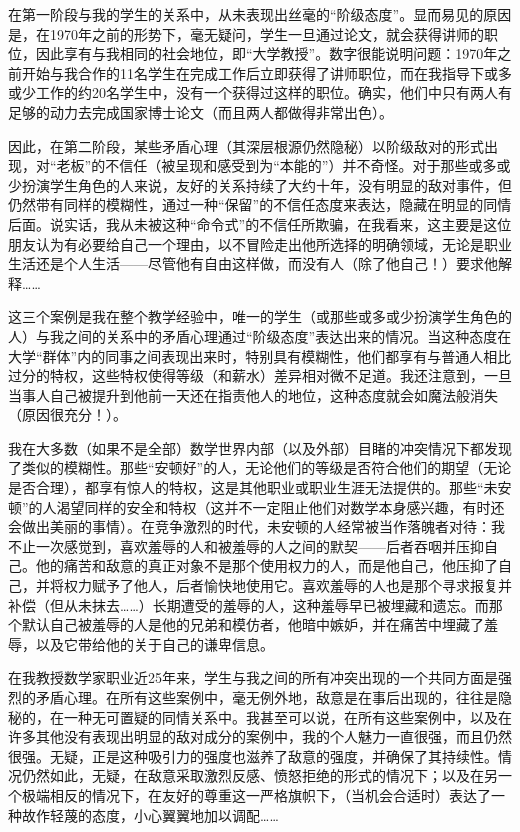 在第一阶段与我的学生的关系中，从未表现出丝毫的``阶级态度''。显而易见的原因是，在1970年之前的形势下，毫无疑问，学生一旦通过论文，就会获得讲师的职位，因此享有与我相同的社会地位，即``大学教授''。数字很能说明问题：1970年之前开始与我合作的11名学生在完成工作后立即获得了讲师职位，而在我指导下或多或少工作的约20名学生中，没有一个获得过这样的职位。确实，他们中只有两人有足够的动力去完成国家博士论文（而且两人都做得非常出色）。

因此，在第二阶段，某些矛盾心理（其深层根源仍然隐秘）以阶级敌对的形式出现，对``老板''的不信任（被呈现和感受到为``本能的''）并不奇怪。对于那些或多或少扮演学生角色的人来说，友好的关系持续了大约十年，没有明显的敌对事件，但仍然带有同样的模糊性，通过一种``保留''的不信任态度来表达，隐藏在明显的同情后面。说实话，我从未被这种``命令式''的不信任所欺骗，在我看来，这主要是这位朋友认为有必要给自己一个理由，以不冒险走出他所选择的明确领域，无论是职业生活还是个人生活——尽管他有自由这样做，而没有人（除了他自己！）要求他解释……

这三个案例是我在整个教学经验中，唯一的学生（或那些或多或少扮演学生角色的人）与我之间的关系中的矛盾心理通过``阶级态度''表达出来的情况。当这种态度在大学``群体''内的同事之间表现出来时，特别具有模糊性，他们都享有与普通人相比过分的特权，这些特权使得等级（和薪水）差异相对微不足道。我还注意到，一旦当事人自己被提升到他前一天还在指责他人的地位，这种态度就会如魔法般消失（原因很充分！）。

我在大多数（如果不是全部）数学世界内部（以及外部）目睹的冲突情况下都发现了类似的模糊性。那些``安顿好''的人，无论他们的等级是否符合他们的期望（无论是否合理），都享有惊人的特权，这是其他职业或职业生涯无法提供的。那些``未安顿''的人渴望同样的安全和特权（这并不一定阻止他们对数学本身感兴趣，有时还会做出美丽的事情）。在竞争激烈的时代，未安顿的人经常被当作落魄者对待：我不止一次感觉到，喜欢羞辱的人和被羞辱的人之间的默契——后者吞咽并压抑自己。他的痛苦和敌意的真正对象不是那个使用权力的人，而是他自己，他压抑了自己，并将权力赋予了他人，后者愉快地使用它。喜欢羞辱的人也是那个寻求报复并补偿（但从未抹去……）长期遭受的羞辱的人，这种羞辱早已被埋藏和遗忘。而那个默认自己被羞辱的人是他的兄弟和模仿者，他暗中嫉妒，并在痛苦中埋藏了羞辱，以及它带给他的关于自己的谦卑信息。

在我教授数学家职业近25年来，学生与我之间的所有冲突出现的一个共同方面是强烈的矛盾心理。在所有这些案例中，毫无例外地，敌意是在事后出现的，往往是隐秘的，在一种无可置疑的同情关系中。我甚至可以说，在所有这些案例中，以及在许多其他没有表现出明显的敌对成分的案例中，我的个人魅力一直很强，而且仍然很强。无疑，正是这种吸引力的强度也滋养了敌意的强度，并确保了其持续性。情况仍然如此，无疑，在敌意采取激烈反感、愤怒拒绝的形式的情况下；以及在另一个极端相反的情况下，在友好的尊重这一严格旗帜下，（当机会合适时）表达了一种故作轻蔑的态度，小心翼翼地加以调配……


